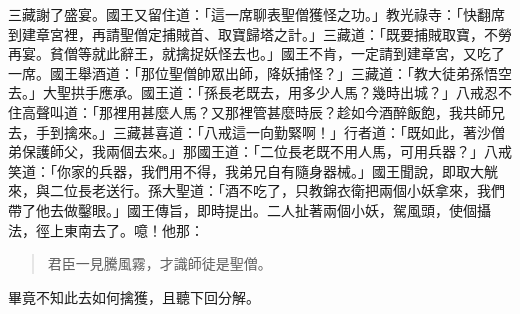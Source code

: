 三藏謝了盛宴。國王又留住道：「這一席聊表聖僧獲怪之功。」教光祿寺：「快翻席到建章宮裡，再請聖僧定捕賊首、取寶歸塔之計。」三藏道：「既要捕賊取寶，不勞再宴。貧僧等就此辭王，就擒捉妖怪去也。」國王不肯，一定請到建章宮，又吃了一席。國王舉酒道：「那位聖僧帥眾出師，降妖捕怪？」三藏道：「教大徒弟孫悟空去。」大聖拱手應承。國王道：「孫長老既去，用多少人馬？幾時出城？」八戒忍不住高聲叫道：「那裡用甚麼人馬？又那裡管甚麼時辰？趁如今酒醉飯飽，我共師兄去，手到擒來。」三藏甚喜道：「八戒這一向勤緊啊！」行者道：「既如此，著沙僧弟保護師父，我兩個去來。」那國王道：「二位長老既不用人馬，可用兵器？」八戒笑道：「你家的兵器，我們用不得，我弟兄自有隨身器械。」國王聞說，即取大觥來，與二位長老送行。孫大聖道：「酒不吃了，只教錦衣衛把兩個小妖拿來，我們帶了他去做鑿眼。」國王傳旨，即時提出。二人扯著兩個小妖，駕風頭，使個攝法，徑上東南去了。噫！他那：
\begin{quote}
君臣一見騰風霧，才識師徒是聖僧。
\end{quote}

畢竟不知此去如何擒獲，且聽下回分解。

